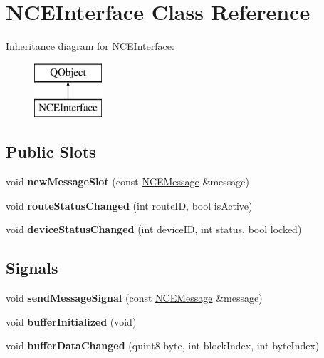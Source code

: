 \hypertarget{class_n_c_e_interface}{}\section{N\+C\+E\+Interface Class Reference}
\label{class_n_c_e_interface}
Inheritance diagram for N\+C\+E\+Interface\+:\begin{figure}[H]
\begin{center}
\leavevmode
\includegraphics[height=2.000000cm]{class_n_c_e_interface}
\end{center}
\end{figure}
\subsection*{Public Slots}
\begin{DoxyCompactItemize}
\item 
\mbox{\label{class_n_c_e_interface_a47932f97e62740e4734fc5a365462b96}} 
void {\bfseries new\+Message\+Slot} (const \hyperlink{class_n_c_e_message}{N\+C\+E\+Message} \&message)
\item 
\mbox{\label{class_n_c_e_interface_a61db42f2bacec3b7f7a234bab9f11899}} 
void {\bfseries route\+Status\+Changed} (int route\+ID, bool is\+Active)
\item 
\mbox{\label{class_n_c_e_interface_a7f5bc3afb5eda7d5747ffec5d13bfdc5}} 
void {\bfseries device\+Status\+Changed} (int device\+ID, int status, bool locked)
\end{DoxyCompactItemize}
\subsection*{Signals}
\begin{DoxyCompactItemize}
\item 
\mbox{\label{class_n_c_e_interface_a7bdaaf5c257df06fafd28579dd1fc594}} 
void {\bfseries send\+Message\+Signal} (const \hyperlink{class_n_c_e_message}{N\+C\+E\+Message} \&message)
\item 
\mbox{\label{class_n_c_e_interface_aeaa6c5acc594a5a439b9d208cce220c9}} 
void {\bfseries buffer\+Initialized} (void)
\item 
\mbox{\label{class_n_c_e_interface_a23b6a6c8d9b16d27c83ebaa7df0d762b}} 
void {\bfseries buffer\+Data\+Changed} (quint8 byte, int block\+Index, int byte\+Index)
\end{DoxyCompactItemize}
